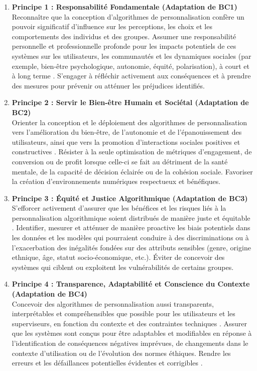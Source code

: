 \documentclass[10pt, twocolumn]{article}
\begin{document}
\begin{enumerate}
    \item \textbf{Principe 1 : Responsabilité Fondamentale (Adaptation de BC1)} \\
    Reconnaître que la conception d'algorithmes de personnalisation confère un pouvoir significatif d'influence sur les perceptions, les choix et les comportements des individus et des groupes. Assumer une responsabilité personnelle et professionnelle profonde pour les impacts potentiels de ces systèmes sur les utilisateurs, les communautés et les dynamiques sociales (par exemple, bien-être psychologique, autonomie, équité, polarisation), à court et à long terme \citep{Biosphere2015}. S'engager à réfléchir activement aux conséquences et à prendre des mesures pour prévenir ou atténuer les préjudices identifiés.

    \item \textbf{Principe 2 : Servir le Bien-être Humain et Sociétal (Adaptation de BC2)} \\
    Orienter la conception et le déploiement des algorithmes de personnalisation vers l'amélioration du bien-être, de l'autonomie et de l'épanouissement des utilisateurs, ainsi que vers la promotion d'interactions sociales positives et constructives \citep{Montreal2018, Biosphere2015}. Résister à la seule optimisation de métriques d'engagement, de conversion ou de profit lorsque celle-ci se fait au détriment de la santé mentale, de la capacité de décision éclairée ou de la cohésion sociale. Favoriser la création d'environnements numériques respectueux et bénéfiques.

    \item \textbf{Principe 3 : Équité et Justice Algorithmique (Adaptation de BC3)} \\
    S'efforcer activement d'assurer que les bénéfices et les risques liés à la personnalisation algorithmique soient distribués de manière juste et équitable \citep{Biosphere2015}. Identifier, mesurer et atténuer de manière proactive les biais potentiels dans les données et les modèles qui pourraient conduire à des discriminations ou à l'exacerbation des inégalités fondées sur des attributs sensibles (genre, origine ethnique, âge, statut socio-économique, etc.). Éviter de concevoir des systèmes qui ciblent ou exploitent les vulnérabilités de certains groupes.

    \item \textbf{Principe 4 : Transparence, Adaptabilité et Conscience du Contexte (Adaptation de BC4)} \\
    Concevoir des algorithmes de personnalisation aussi transparents, interprétables et compréhensibles que possible pour les utilisateurs et les superviseurs, en fonction du contexte et des contraintes techniques \citep{Biosphere2015}. Assurer que les systèmes sont conçus pour être adaptables et modifiables en réponse à l'identification de conséquences négatives imprévues, de changements dans le contexte d'utilisation ou de l'évolution des normes éthiques. Rendre les erreurs et les défaillances potentielles évidentes et corrigibles \citep{Biosphere2015}.


\end{enumerate}
\end{document}
